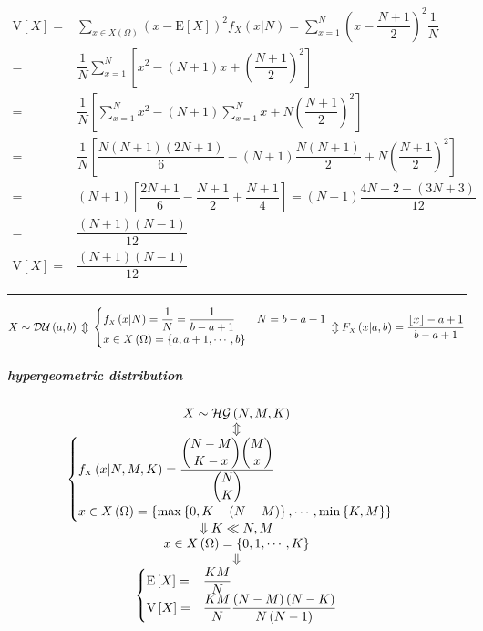 \documentclass[
]{book}
\theoremstyle{definition}
\theoremstyle{definition}
\theoremstyle{definition}
\theoremstyle{definition}
\theoremstyle{remark}
\begin{document}
\[
\begin{aligned}
\mathrm{V}\left[X\right]= & \sum_{x\in X\left(\Omega\right)}\left(x-\mathrm{E}\left[X\right]\right)^{2}f_{{\scriptscriptstyle X}}\left(x|N\right)=\sum_{x=1}^{N}\left(x-\dfrac{N+1}{2}\right)^{2}\dfrac{1}{N}\\
= & \dfrac{1}{N}\sum_{x=1}^{N}\left[x^{2}-\left(N+1\right)x+\left(\dfrac{N+1}{2}\right)^{2}\right]\\
= & \dfrac{1}{N}\left[\sum_{x=1}^{N}x^{2}-\left(N+1\right)\sum_{x=1}^{N}x+N\left(\dfrac{N+1}{2}\right)^{2}\right]\\
= & \dfrac{1}{N}\left[\dfrac{N\left(N+1\right)\left(2N+1\right)}{6}-\left(N+1\right)\dfrac{N\left(N+1\right)}{2}+N\left(\dfrac{N+1}{2}\right)^{2}\right]\\
= & \left(N+1\right)\left[\dfrac{2N+1}{6}-\dfrac{N+1}{2}+\dfrac{N+1}{4}\right]=\left(N+1\right)\dfrac{4N+2-\left(3N+3\right)}{12}\\
= & \dfrac{\left(N+1\right)\left(N-1\right)}{12}\\
\mathrm{V}\left[X\right]= & \dfrac{\left(N+1\right)\left(N-1\right)}{12}
\end{aligned}
\]

\begin{center}\rule{0.5\linewidth}{0.5pt}\end{center}

\[
X\sim\mathcal{DU}\left(a,b\right)\\\Updownarrow\\\begin{cases}
f_{{\scriptscriptstyle X}}\left(x|N\right)=\dfrac{1}{N}=\dfrac{1}{b-a+1} & N=b-a+1\\
x\in X\left(\Omega\right)=\left\{ a,a+1,\cdots,b\right\} 
\end{cases}\\\Updownarrow\\F_{{\scriptscriptstyle X}}\left(x|a,b\right)=\dfrac{\left\lfloor x\right\rfloor -a+1}{b-a+1}
\]

\subparagraph{hypergeometric distribution}\label{hypergeometric-distribution}

\[
\begin{array}{c}
X\sim\mathcal{HG}\left(N,M,K\right)\\
\Updownarrow\\
\begin{cases}
f_{{\scriptscriptstyle X}}\left(x|N,M,K\right)=\dfrac{\dbinom{N-M}{K-x}\dbinom{M}{x}}{\dbinom{N}{K}}\\
x\in X\left(\Omega\right)=\left\{ \max\left\{ 0,K-\left(N-M\right)\right\} ,\cdots,\min\left\{ K,M\right\} \right\} 
\end{cases}\\
\Downarrow K\ll N,M\\
x\in X\left(\Omega\right)=\left\{ 0,1,\cdots,K\right\} \\
\Downarrow\\
\begin{cases}
\mathrm{E}\left[X\right]= & \dfrac{KM}{N}\\
\mathrm{V}\left[X\right]= & \dfrac{KM}{N}\dfrac{\left(N-M\right)\left(N-K\right)}{N\left(N-1\right)}
\end{cases}
\end{array}
\]
\end{document}
